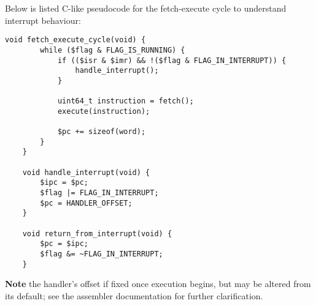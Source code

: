 \documentclass[10pt]{article}
\begin{document}
    Below is listed C-like pseudocode for the fetch-execute cycle to understand interrupt behaviour:

    \begin{lstlisting}[style=c,label={lst:lstlisting}]
    void fetch_execute_cycle(void) {
        while ($flag & FLAG_IS_RUNNING) {
            if (($isr & $imr) && !($flag & FLAG_IN_INTERRUPT)) {
                handle_interrupt();
            }

            uint64_t instruction = fetch();
            execute(instruction);

            $pc += sizeof(word);
        }
    }

    void handle_interrupt(void) {
        $ipc = $pc;
        $flag |= FLAG_IN_INTERRUPT;
        $pc = HANDLER_OFFSET;
    }

    void return_from_interrupt(void) {
        $pc = $ipc;
        $flag &= ~FLAG_IN_INTERRUPT;
    }
    \end{lstlisting}

    \textbf{Note} the handler's offset if fixed once execution begins, but may be altered from its default; see the assembler documentation for further clarification.
\end{document}
